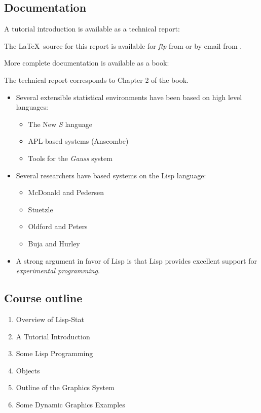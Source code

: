 \begin{slide}{}
\section{Documentation}
A tutorial introduction is available as a technical report:


The \LaTeX\ source for this report is available for {\em ftp}\/ from
 or by email from .

More complete documentation is available as a book:


The technical report corresponds to Chapter 2 of the book.
\end{slide}

\begin{slide}{}
\begin{itemize}
\item
Several extensible statistical environments have been based on high
level languages:
\begin{itemize}
\item The New {\em S}\/ language
\item APL-based systems (Anscombe)
\item Tools for the {\em Gauss}\/ system
\end{itemize}
\item
Several researchers have based systems on the Lisp language:
\begin{itemize}
\item McDonald and Pedersen
\item Stuetzle
\item Oldford and Peters
\item Buja and Hurley
\end{itemize}
\item
A strong argument in favor of Lisp is that Lisp provides excellent
support for {\em experimental programming}.
\end{itemize}
\end{slide}

\begin{slide}{}
\section{Course outline}
\begin{enumerate}
\item Overview of Lisp-Stat
\item A Tutorial Introduction
\item Some Lisp Programming
\item Objects
\item Outline of the Graphics System
\item Some Dynamic Graphics Examples
\end{enumerate}
\end{slide}

